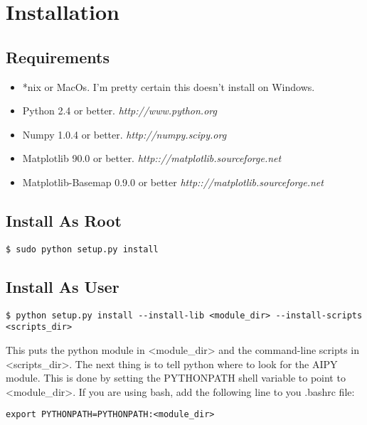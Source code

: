 \documentclass[10pt]{article}
\begin{document}
\section{Installation}

\subsection{Requirements}

\begin{itemize}
\item[] *nix or MacOs.  I'm pretty certain this doesn't install on Windows.
\item[] Python 2.4 or better.  {\it http://www.python.org}
\item[] Numpy 1.0.4 or better. {\it http://numpy.scipy.org}
\item[] Matplotlib 90.0 or better. {\it http:://matplotlib.sourceforge.net}
\item[] Matplotlib-Basemap 0.9.0 or better
        {\it http:://matplotlib.sourceforge.net}
\end{itemize}

\subsection{Install As Root}

\begin{verbatim}
$ sudo python setup.py install
\end{verbatim}

\subsection{Install As User}

\begin{verbatim}
$ python setup.py install --install-lib <module_dir> --install-scripts <scripts_dir>
\end{verbatim}

This puts the python module in <module\_dir> and the command-line scripts
in <scripts\_dir>.  The next thing is to tell python where to look
for the AIPY module.  This is done by setting the PYTHONPATH shell variable
to point to <module\_dir>.  If you are using bash, add the following line
to you .bashrc file:
\begin{verbatim}
export PYTHONPATH=PYTHONPATH:<module_dir>
\end{verbatim}




% 
% 

\end{document}

